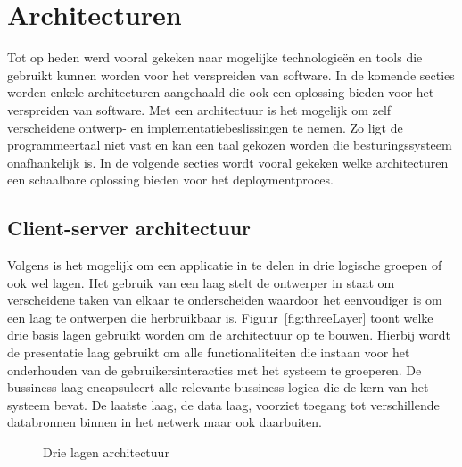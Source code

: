 \section{Architecturen}
Tot op heden werd vooral gekeken naar mogelijke technologieën en tools die gebruikt kunnen worden voor het verspreiden van software.
In de komende secties worden enkele architecturen aangehaald die ook een oplossing bieden voor het verspreiden van software.
Met een architectuur is het mogelijk om zelf verscheidene ontwerp- en implementatiebeslissingen te nemen.
Zo ligt de programmeertaal niet vast en kan een taal gekozen worden die besturingssysteem onafhankelijk is.
In de volgende secties wordt vooral gekeken welke architecturen een schaalbare oplossing bieden voor het deploymentproces.

\subsection{Client-server architectuur}
Volgens \citet{micro} is het mogelijk om een applicatie in te delen in drie logische groepen of ook wel lagen.
Het gebruik van een laag stelt de ontwerper in staat om verscheidene taken van elkaar te onderscheiden waardoor het eenvoudiger is om een laag te ontwerpen die herbruikbaar is.
Figuur~\vref{fig:threeLayer} toont welke drie basis lagen gebruikt worden om de architectuur op te bouwen.
Hierbij wordt de presentatie laag gebruikt om alle functionaliteiten die instaan voor het onderhouden van de gebruikersinteracties met het systeem te groeperen.
De bussiness laag encapsuleert alle relevante bussiness logica die de kern van het systeem bevat.
De laatste laag, de data laag, voorziet toegang tot verschillende databronnen binnen in het netwerk maar ook daarbuiten.
 
\begin{figure}[!ht]
\centering
{}
\caption{Drie lagen architectuur \citep{micro}}
\label{fig:threeLayer}
\end{figure}

